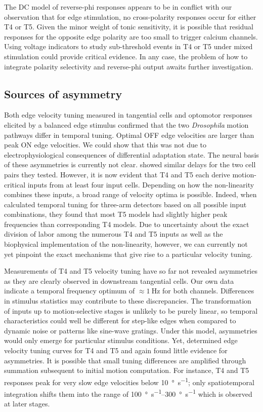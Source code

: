 The DC model of reverse-phi responses appears to be in conflict with our observation that for edge stimulation, no cross-polarity responses occur for either T4 or T5. Given the minor weight of tonic sensitivity, it is possible that residual responses for the opposite edge polarity are too small to trigger calcium channels. Using voltage indicators to study sub-threshold events in T4 or T5 under mixed stimulation could provide critical evidence. In any case, the problem of how to integrate polarity selectivity and reverse-phi output awaits further investigation.

\subsection{Sources of asymmetry}
Both edge velocity tuning measured in tangential cells and optomotor responses elicited by a balanced edge stimulus confirmed that the two \textit{Drosophila} motion pathways differ in temporal tuning. Optimal OFF edge velocities are larger than peak ON edge velocities. We could show that this was not due to electrophysiological consequences of differential adaptation state. The neural basis of these asymmetries is currently not clear. \citet{Behnia:2014jh} showed similar delays for the two cell pairs they tested. However, it is now evident that T4 and T5 each derive motion-critical inputs from at least four input cells. Depending on how the non-linearity combines these inputs, a broad range of velocity optima is possible. Indeed, when \citet{Arenz:2017aa} calculated temporal tuning for three-arm detectors based on all possible input combinations, they found that most T5 models had slightly higher peak frequencies than corresponding T4 models. Due to uncertainty about the exact division of labor among the numerous T4 and T5 inputs as well as the biophysical implementation of the non-linearity, however, we can currently not yet pinpoint the exact mechanisms that give rise to a particular velocity tuning.

Measurements of T4 and T5 velocity tuning have so far not revealed asymmetries as they are clearly observed in downstream tangential cells. Our own data indicate a temporal frequency optimum of $\approx \SI{1}{\hertz}$ for both channels. Differences in stimulus statistics may contribute to these discrepancies. The transformation of inputs up to motion-selective stages is unlikely to be purely linear, so temporal characteristics could well be different for step-like edges when compared to dynamic noise or patterns like sine-wave gratings. Under this model, asymmetries would only emerge for particular stimulus conditions. Yet, \citet{Arenz:2017aa} determined edge velocity tuning curves for T4 and T5 and again found little evidence for asymmetries. It is possible that small tuning differences are amplified through summation subsequent to initial motion computation. For instance, T4 and T5 responses peak for very slow edge velocities below \SI{10}{\degree\per\second}; only spatiotemporal integration shifts them into the range of \SIrange{100}{300}{\degree\per\second} which is observed at later stages.

